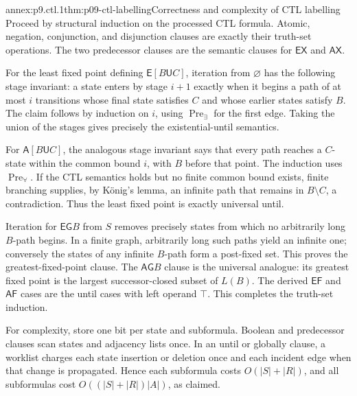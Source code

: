 \begin{annexitem}{annex:p9.ctl.1}{thm:p09-ctl-labelling}{Correctness and complexity of CTL labelling}
Proceed by structural induction on the processed CTL formula.  Atomic,
negation, conjunction, and disjunction clauses are exactly their truth-set
operations.  The two predecessor clauses are the semantic clauses for
\(\mathsf{EX}\) and \(\mathsf{AX}\).

For the least fixed point defining \(\mathsf E[B\mathsf U C]\), iteration from
\(\varnothing\) has the following stage invariant: a state enters by stage
\(i+1\) exactly when it begins a path of at most \(i\) transitions whose final
state satisfies \(C\) and whose earlier states satisfy \(B\).  The claim follows
by induction on \(i\), using \(\operatorname{Pre}_{\exists}\) for the first
edge.  Taking the union of the stages gives precisely the existential-until
semantics.

For \(\mathsf A[B\mathsf U C]\), the analogous stage invariant says that every
path reaches a \(C\)-state within the common bound \(i\), with \(B\) before
that point.  The induction uses \(\operatorname{Pre}_{\forall}\).  If the CTL
semantics holds but no finite common bound exists, finite branching supplies,
by K\"onig's lemma, an infinite path that remains in \(B\setminus C\), a
contradiction.  Thus the least fixed point is exactly universal until.

Iteration for \(\mathsf{EG}B\) from \(S\) removes precisely states from which
no arbitrarily long \(B\)-path begins.  In a finite graph, arbitrarily long
such paths yield an infinite one; conversely the states of any infinite
\(B\)-path form a post-fixed set.  This proves the greatest-fixed-point clause.
The \(\mathsf{AG}B\) clause is the universal analogue: its greatest fixed point
is the largest successor-closed subset of \(L(B)\).  The derived
\(\mathsf{EF}\) and \(\mathsf{AF}\) cases are the until cases with left operand
\(\top\).  This completes the truth-set induction.

For complexity, store one bit per state and subformula.  Boolean and predecessor
clauses scan states and adjacency lists once.  In an until or globally clause,
a worklist charges each state insertion or deletion once and each incident edge
when that change is propagated.  Hence each subformula costs
\(O(|S|+|R|)\), and all subformulas cost
\(O((|S|+|R|)|A|)\), as claimed.
\end{annexitem}

